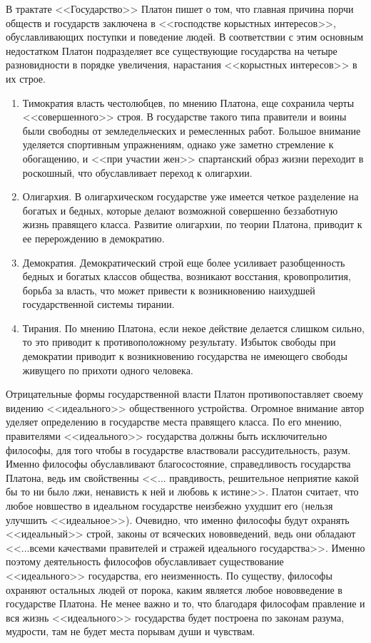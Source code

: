 	В трактате <<Государство>> Платон пишет о том, что главная причина порчи 
	обществ и государств заключена в <<господстве корыстных интересов>>, 
	обуславливающих поступки и поведение людей. В соответствии с этим основным 
	недостатком Платон подразделяет все существующие государства на четыре 
	разновидности в порядке увеличения, нарастания <<корыстных интересов>> в 
	их строе. 

	\begin{enumerate}
		\item Тимократия власть честолюбцев, по мнению Платона, еще 
			сохранила черты <<совершенного>> строя. В государстве такого типа 
			правители и воины были свободны от земледельческих и ремесленных 
			работ. Большое внимание уделяется спортивным упражнениям, однако 
			уже заметно стремление к обогащению, и <<при участии жен>> 
			спартанский образ жизни переходит в роскошный, что обуславливает 
			переход к олигархии. 
		\item Олигархия. В олигархическом государстве уже имеется четкое 
			разделение на богатых и бедных, которые делают возможной 
			совершенно беззаботную жизнь правящего класса. Развитие 
			олигархии, по теории Платона, приводит к ее перерождению в 
			демократию. 
		\item Демократия. Демократический строй еще более усиливает 
			разобщенность бедных и богатых классов общества, возникают 
			восстания, кровопролития, борьба за власть, что может привести к 
			возникновению наихудшей государственной системы тирании. 
		\item Тирания. По мнению Платона, если некое действие делается 
			слишком сильно, то это приводит к противоположному результату. 
			Избыток свободы при демократии приводит к возникновению 
			государства не имеющего свободы живущего по прихоти одного 
			человека.
	\end{enumerate}

	Отрицательные формы государственной власти Платон противопоставляет своему 
	видению <<идеального>> общественного устройства. Огромное внимание автор 
	уделяет определению в государстве места правящего класса. По его мнению, 
	правителями <<идеального>> государства должны быть исключительно философы, 
	для того чтобы в государстве властвовали рассудительность, разум. Именно 
	философы обуславливают благосостояние, справедливость государства Платона, 
	ведь им свойственны <<... правдивость, решительное неприятие какой бы то ни 
	было лжи, ненависть к ней и любовь к истине>>. Платон считает, что любое 
	новшество в идеальном государстве неизбежно ухудшит его (нельзя улучшить 
	<<идеальное>>). Очевидно, что именно философы будут охранять <<идеальный>> 
	строй, законы от всяческих нововведений, ведь они обладают <<...всеми 
	качествами правителей и стражей идеального государства>>. Именно поэтому 
	деятельность философов обуславливает существование <<идеального>> 
	государства, его неизменность. По существу, философы охраняют остальных 
	людей от порока, каким является любое нововведение в государстве Платона. 
	Не менее важно и то, что благодаря философам правление и вся жизнь 
	<<идеального>> государства будет построена по законам разума, мудрости, там 
	не будет места порывам души и чувствам. 

